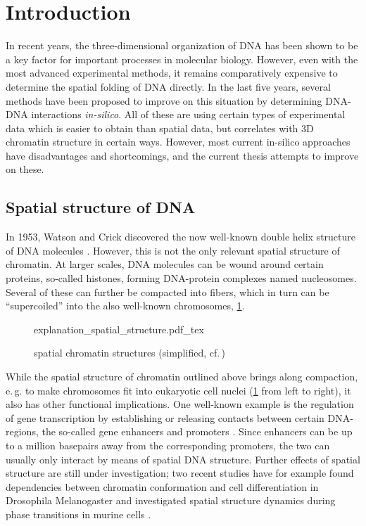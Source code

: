 %
\section{Introduction}
In recent years, the three-dimensional organization of DNA has been shown to 
be a key factor for important processes in molecular biology.
However, even with the most advanced experimental methods, 
it remains comparatively expensive to determine the spatial folding of DNA directly.
In the last five years, several methods have been proposed to improve on this situation
by determining DNA-DNA interactions \emph{in-silico}.
All of these are using certain types of experimental data which is easier to obtain than spatial data, but correlates with 3D chromatin structure in certain ways.
However, most current in-silico approaches have disadvantages and shortcomings,
and the current thesis attempts to improve on these.

\subsection{Spatial structure of DNA}
In 1953, Watson and Crick discovered the now well-known double helix structure of DNA molecules \cite{Watson1953}.
However, this is not the only relevant spatial structure of chromatin. 
At larger scales, DNA molecules can be wound around certain proteins, so-called histones, forming DNA-protein complexes named nucleosomes.
Several of these can further be compacted into fibers, which in turn can be ``supercoiled'' into the also well-known chromosomes, \cref{fig:intro:spatial_chrom_structures}.
\begin{figure}[h!]
 \small
 \centering
 {explanation_spatial_structure.pdf_tex}
 \caption{spatial chromatin structures (simplified, cf.\,\cite{Lee2001})} \label{fig:intro:spatial_chrom_structures}
\end{figure}

While the spatial structure of chromatin outlined above brings along compaction, 
e.\,g. to make chromosomes fit into eukaryotic cell nuclei (\cref{fig:intro:spatial_chrom_structures} from left to right), 
it also has other functional implications.
One well-known example is the regulation of gene transcription by establishing or releasing contacts
between certain DNA-regions, the so-called gene enhancers and promoters \cite{Smallwood2013,Gorkin2014}.
Since enhancers can be up to a million basepairs away from the corresponding promoters, 
the two can usually only interact by means of spatial DNA structure.
Further effects of spatial structure are still under investigation;
two recent studies have for example found dependencies between chromatin conformation 
and cell differentiation in Drosophila Melanogaster \cite{Chathoth2019}
and investigated spatial structure dynamics during phase transitions in murine cells \cite{Zhang2019b}.

